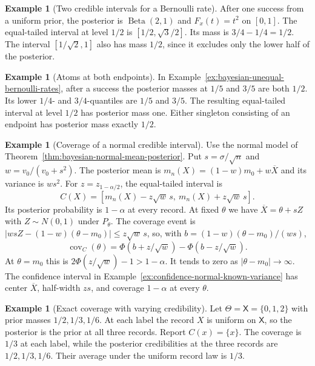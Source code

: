 \documentclass[11pt,oneside]{book}
\theoremstyle{definition}
\newtheorem{example}[theorem]{Example}
\theoremstyle{remark}
\begin{document}
\begin{example}[Two credible intervals for a Bernoulli rate]
\label{ex:bayesian-credible-beta}
After one success from a uniform prior, the posterior is
$\operatorname{Beta}(2,1)$ and $F_x(t)=t^2$ on $[0,1]$.
The equal-tailed interval at level $1/2$ is
$[1/2,\sqrt3/2]$. Its mass is $3/4-1/4=1/2$.
The interval $[1/\sqrt2,1]$ also has mass $1/2$, since it
excludes only the lower half of the posterior.
\end{example}

\begin{example}[Atoms at both endpoints]
\label{ex:bayesian-credible-two-atoms}
In Example~\ref{ex:bayesian-unequal-bernoulli-rates}, after a
success the posterior masses at $1/5$ and $3/5$ are both $1/2$.
Its lower $1/4$- and $3/4$-quantiles are $1/5$ and $3/5$.
The resulting equal-tailed interval at level $1/2$
has posterior mass one. Either singleton consisting of an
endpoint has posterior mass exactly $1/2$.
\end{example}

\begin{example}[Coverage of a normal credible interval]
\label{ex:bayesian-credible-normal-coverage}
Use the normal model of Theorem~\ref{thm:bayesian-normal-mean-posterior}.
Put $s=\sigma/\sqrt n$ and $w=v_0/(v_0+s^2)$. The posterior
mean is $m_n(X)=(1-w)m_0+w\overline X$ and its variance is
$ws^2$. For $z=z_{1-\alpha/2}$, the equal-tailed interval is
\[
C(X)=[m_n(X)-z\sqrt w\,s,\ m_n(X)+z\sqrt w\,s].
\]
Its posterior probability is $1-\alpha$ at every record.
At fixed $\theta$ we have $\overline X=\theta+sZ$ with
$Z\sim N(0,1)$ under $P_\theta$. The coverage event is
$|wsZ-(1-w)(\theta-m_0)|\leq z\sqrt w\,s$, so, with
$b=(1-w)(\theta-m_0)/(ws)$,
\[
\operatorname{cov}_C(\theta)
=\Phi(b+z/\sqrt w)-\Phi(b-z/\sqrt w).
\]
At $\theta=m_0$ this is $2\Phi(z/\sqrt w)-1>1-\alpha$.
It tends to zero as $|\theta-m_0|\to\infty$.
The confidence interval in Example~\ref{ex:confidence-normal-known-variance}
has center $\overline X$, half-width $zs$, and coverage $1-\alpha$
at every $\theta$.
\end{example}

\begin{example}[Exact coverage with varying credibility]
\label{ex:bayesian-exact-coverage-varying-credibility}
Let $\Theta=\mathsf X=\{0,1,2\}$ with prior masses $1/2,1/3,1/6$.
At each label the record $X$ is uniform on $\mathsf X$, so the
posterior is the prior at all three records. Report $C(x)=\{x\}$.
The coverage is $1/3$ at each label, while the posterior
credibilities at the three records are $1/2,1/3,1/6$.
Their average under the uniform record law is $1/3$.
\end{example}
\end{document}
